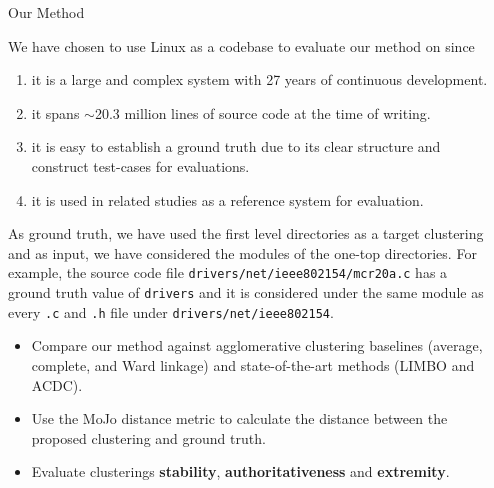 \documentclass[final]{beamer}
\newlength{\sepwidth}
\newlength{\colwidth}
\newcommand{\separatorcolumn}{\begin{column}{\sepwidth}\end{column}}
\begin{document}
\begin{frame}[t]
\begin{columns}[t]
\begin{column}{\colwidth}
\begin{alertblock}{Our Method}


We have chosen to use Linux as a codebase to evaluate our method on since 

\begin{enumerate}

\item it is a large and complex system with 27 years of continuous development. 
\item it spans $\sim$20.3 million lines of source code at the time of writing.
\item  it is easy to establish a ground truth due to its clear structure and construct test-cases for evaluations. 

\item it is used in related studies \cite{acdc, evaluation} as a reference system for evaluation.

\end{enumerate}

As ground truth, we have used the first level directories as a target clustering and as input, we have considered 
the modules of the one-top directories. 
For example, the source code file \texttt{drivers/net/ieee802154\-/mcr20a.c} has a ground truth value of \texttt{drivers} 
and it is considered under the same module as every \texttt{.c} and \texttt{.h} file under \texttt{drivers/net/ieee802154}. 


\begin{itemize}

\item Compare our method against agglomerative clustering baselines (average, complete, and Ward linkage) and state-of-the-art methods (LIMBO and ACDC).
\item Use the MoJo distance metric to calculate the distance between the proposed clustering and ground truth.
\item Evaluate clusterings \textbf{stability}, \textbf{authoritativeness} and \textbf{extremity}.

\end{itemize}

\end{alertblock}

	
	
	
	

\end{column}

\separatorcolumn


\end{columns}
\end{frame}
\end{document}
